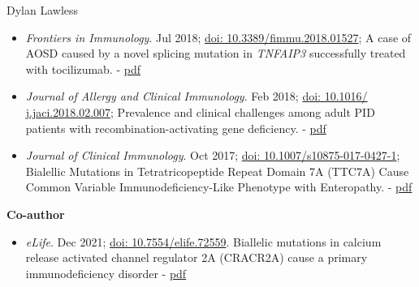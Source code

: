 \documentclass[11pt,a4paper]{article}
\begin{document}
\begin{cv}{Dylan Lawless}
\begin{itemize}[leftmargin=*]
\item \emph{Frontiers in Immunology}. Jul 2018;
\href{https://doi.org/10.3389/fimmu.2018.01527}{doi: 10.3389/fimmu.2018.01527};
A case of AOSD caused by a novel splicing mutation in \textit{TNFAIP3} successfully treated with tocilizumab.
- \href{https://lawlessgenomics.com/resume/pdf/2018FrontImmLawless_A_Case_of_Adult-Onset_Stills_Disease_Caused_by_a_Novel_Splicing_Mutation_in_TNFAIP3_Successfully_Treated_With_Tocilizumab.pdf}{pdf}


\item \emph{Journal of Allergy and Clinical Immunology}. Feb 2018; 
\href{https://doi.org/10.1016/j.jaci.2018.02.007}{doi: 10.1016/ j.jaci.2018.02.007};
Prevalence and clinical challenges among adult PID patients with recombination-activating gene deficiency.
- \href{https://lawlessgenomics.com/resume/pdf/2018JACILawless_Prevalence_and_clinical_challenges_among_adults_with_primary_immunodeficiency_and_recombination_activating_gene_deficiency.Letter.pdf}{pdf}


\item \emph{Journal of Clinical Immunology}. Oct 2017; 
\href{https://doi.org/10.1007/s10875-017-0427-1}{doi: 10.1007/s10875-017-0427-1};
Bialellic Mutations in Tetratricopeptide Repeat Domain 7A (TTC7A) Cause Common Variable Immunodeficiency-Like Phenotype with Enteropathy.
- \href{https://lawlessgenomics.com/resume/pdf/2017JOCILawless_Bialellic\%20Mutations\%20in\%20Tetratricopeptide\%20Repeat\%20Domain\%207A\%20(TTC7A)\%20Cause\%20Common\%20Variable\%20Immunodeficiency-Like\%20Phenotype\%20with\%20Enteropathy\%2010.1007_s10875-017-0427-1.pdf}{pdf}


\end{itemize}
\textbf{Co-author}
\begin{itemize}[leftmargin=*]
\item \emph{eLife}. Dec 2021;
\href{https://elifesciences.org/articles/72559}{doi: 10.7554/elife.72559}.
Biallelic mutations in calcium release activated channel regulator 2A (CRACR2A) cause a primary immunodeficiency disorder
- \href{https://lawlessgenomics.com/resume/pdf/2021eLife_Wu_Rice_Biallelic_mutations_in_calcium_release_activated_channel_regulator_2A_(CRACR2A)_cause_a_primary_immunodeficiency_disorder.pdf}{pdf}


\end{itemize}
\end{cv}
\end{document}
